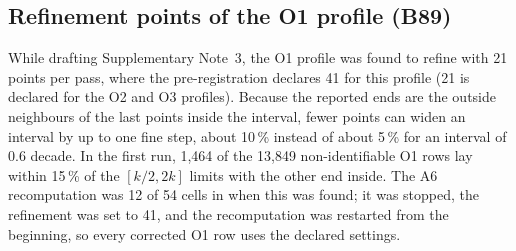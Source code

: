 \subsection*{Refinement points of the O1 profile (B89)}
While drafting Supplementary Note~3, the O1 profile was found to refine with 21 points per pass,
where the pre-registration declares 41 for this profile (21 is declared for the O2 and O3
profiles). Because the reported ends are the outside neighbours of the last points inside the
interval, fewer points can widen an interval by up to one fine step, about 10\,\% instead of
about 5\,\% for an interval of 0.6 decade. In the first run, 1,464 of the 13,849
non-identifiable O1 rows lay within 15\,\% of the $[k/2, 2k]$ limits with the other end
inside. The A6 recomputation was 12 of 54 cells in when this was found; it was stopped, the
refinement was set to 41, and the recomputation was restarted from the beginning, so every
corrected O1 row uses the declared settings.

